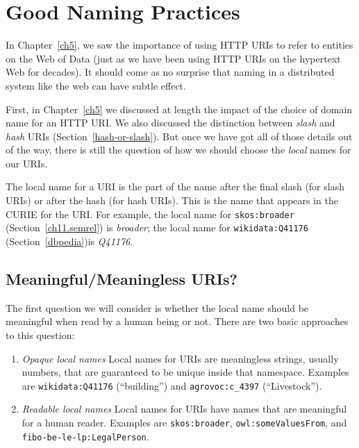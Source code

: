 

\section{Good Naming Practices}
\label{ch15Naming}

In Chapter~\ref{ch5}, we saw the importance of using HTTP URIs to refer to entities
on the Web of Data (just as we have been using HTTP URIs on the hypertext Web for decades).
It should come as no surprise that naming in a distributed system like the web
can have subtle effect. 

First, in Chapter~\ref{ch5} we discussed at length the impact of the choice of 
domain name for an HTTP URI.   We also discussed the distinction between \emph{slash} and 
\emph{hash} URIs (Section~\ref{hash-or-slash}).  But once we have got all of those details 
out of the way, there is still the question of how we should choose the \emph{local} names 
for our URIs. 

The local name for a URI is the part of the name after the final slash (for slash URIs) or 
after the hash (for hash URIs).  This is the name that appears in the CURIE for the URI. 
For example, the local name for \texttt{skos:broader}  (Section~\ref{ch11.semrel}) is 
\emph{broader}; the local name for \texttt{wikidata:Q41176} (Section~\ref{dbpedia})is 
\emph{Q41176}. 

\subsection{Meaningful/Meaningless URIs?}

The first question we will consider is whether the local name should be meaningful
when read by a human being or not.  There are two basic approaches to this question: 

\begin{enumerate}
    \item \emph{Opaque local names} Local names for URIs are meaningless strings, usually numbers, that are guaranteed to be unique inside that namespace.  Examples are \texttt{wikidata:Q41176} (``building'') and \texttt{agrovoc:c\_4397} (``Livestock''). 
    \item \emph{Readable local names} Local names for URIs have names that are meaningful
    for a human reader.  Examples are \texttt{skos:broader}, \texttt{owl:someValuesFrom}, and \texttt{fibo-be-le-lp:LegalPerson}.
\end{enumerate}

